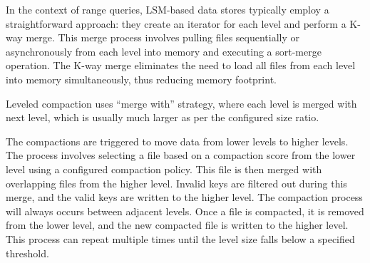 In the context of range queries, LSM-based data stores typically employ a straightforward approach: they create an 
iterator for each level and perform a K-way merge. This merge process involves pulling files sequentially or 
asynchronously from each level into memory and executing a sort-merge operation. The K-way merge eliminates the need 
to load all files from each level into memory simultaneously, thus reducing memory footprint.

 Leveled compaction uses ``merge with'' strategy, where each level is merged with 
next level, which is usually much larger as per the configured size ratio.

The compactions are triggered to move data from lower levels to higher levels. The process involves selecting a file 
based on a compaction score from the lower level using a configured compaction policy. This file is then merged with 
overlapping files from the higher level. Invalid keys are filtered out during this merge, and the valid keys are 
written to the higher level. The compaction process will always occurs between adjacent levels. Once a file is compacted, 
it is removed from the lower level, and the new compacted file is written to the higher level. This process can repeat
multiple times until the level size falls below a specified threshold.